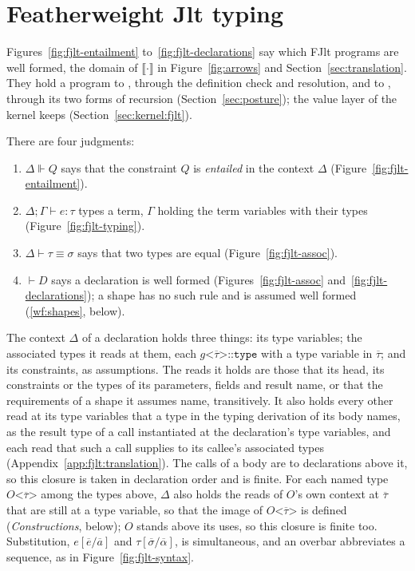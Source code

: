 \section{Featherweight Jlt typing}
\label{app:fjlt:typing}

Figures~\ref{fig:fjlt-entailment} to~\ref{fig:fjlt-declarations} say which FJlt programs are well formed, the domain of $\llbracket\cdot\rrbracket$ in Figure~\ref{fig:arrows} and Section~\ref{sec:translation}.
They hold a program to \RuleTwo{}, through the definition check and resolution, and to \RuleThree{}, through its two forms of recursion (Section~\ref{sec:posture}); the value layer of the kernel keeps \RuleOne{} (Section~\ref{sec:kernel:fjlt}).

There are four judgments:
\begin{enumerate}
\item $\Delta \Vdash Q$ says that the constraint $Q$ is \emph{entailed} in the context $\Delta$ (Figure~\ref{fig:fjlt-entailment}).
\item $\Delta; \Gamma \vdash e : \tau$ types a term, $\Gamma$ holding the term variables with their types (Figure~\ref{fig:fjlt-typing}).
\item $\Delta \vdash \tau \equiv \sigma$ says that two types are equal (Figure~\ref{fig:fjlt-assoc}).
\item $\vdash D$ says a declaration is well formed (Figures~\ref{fig:fjlt-assoc} and~\ref{fig:fjlt-declarations}); a shape has no such rule and is assumed well formed (\ref{wf:shapes}, below).
\end{enumerate}
The context $\Delta$ of a declaration holds three things: its type variables; the associated types it reads at them, each $g\texttt{<}\overline{\tau}\texttt{>::type}$ with a type variable in $\overline{\tau}$; and its constraints, as assumptions.
The reads it holds are those that its head, its constraints or the types of its parameters, fields and result name, or that the requirements of a shape it assumes name, transitively.
It also holds every other read at its type variables that a type in the typing derivation of its body names, as the result type of a call instantiated at the declaration's type variables, and each read that such a call supplies to its callee's associated types (Appendix~\ref{app:fjlt:translation}).
The calls of a body are to declarations above it, so this closure is taken in declaration order and is finite.
For each named type $O\texttt{<}\overline{\tau}\texttt{>}$ among the types above, $\Delta$ also holds the reads of $O$'s own context at $\overline{\tau}$ that are still at a type variable, so that the image of $O\texttt{<}\overline{\tau}\texttt{>}$ is defined (\emph{Constructions}, below); $O$ stands above its uses, so this closure is finite too.
Substitution, $e[\overline{e}/\overline{a}]$ and $\tau[\overline{\sigma}/\overline{\alpha}]$, is simultaneous, and an overbar abbreviates a sequence, as in Figure~\ref{fig:fjlt-syntax}.

